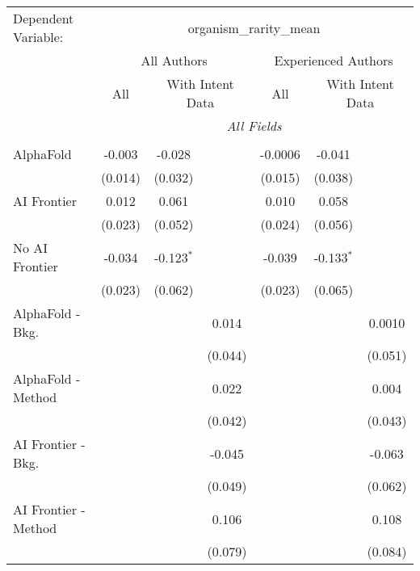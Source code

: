 \begingroup
\centering
\begin{tabular}{lcccccc}
   \tabularnewline \midrule \midrule
   Dependent Variable: & \multicolumn{6}{c}{organism\_rarity\_mean}\\
 & \multicolumn{3}{c}{All Authors} & \multicolumn{3}{c}{Experienced Authors} \\
\cmidrule(lr){2-4} \cmidrule(lr){5-7}
 & \multicolumn{1}{c}{All} & \multicolumn{2}{c}{With Intent Data} & \multicolumn{1}{c}{All} & \multicolumn{2}{c}{With Intent Data} \\
\cmidrule(lr){2-2} \cmidrule(lr){3-4} \cmidrule(lr){5-5} \cmidrule(lr){6-7}
 & \multicolumn{6}{c}{\textit{All Fields}} \\ \\
   AlphaFold               & -0.003  & -0.028       &         & -0.0006 & -0.041       &   \\   
                           & (0.014) & (0.032)      &         & (0.015) & (0.038)      &   \\   
   AI Frontier             & 0.012   & 0.061        &         & 0.010   & 0.058        &   \\   
                           & (0.023) & (0.052)      &         & (0.024) & (0.056)      &   \\   
   No AI Frontier          & -0.034  & -0.123$^{*}$ &         & -0.039  & -0.133$^{*}$ &   \\   
                           & (0.023) & (0.062)      &         & (0.023) & (0.065)      &   \\   
   AlphaFold - Bkg.        &         &              & 0.014   &         &              & 0.0010\\   
                           &         &              & (0.044) &         &              & (0.051)\\   
   AlphaFold - Method      &         &              & 0.022   &         &              & 0.004\\   
                           &         &              & (0.042) &         &              & (0.043)\\   
   AI Frontier - Bkg.      &         &              & -0.045  &         &              & -0.063\\   
                           &         &              & (0.049) &         &              & (0.062)\\   
   AI Frontier - Method    &         &              & 0.106   &         &              & 0.108\\   
                           &         &              & (0.079) &         &              & (0.084)\\   

\end{tabular}

